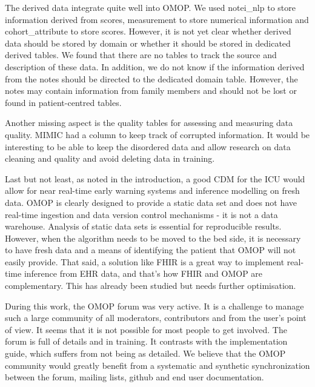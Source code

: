 The derived data integrate quite well into OMOP. We used notei\_nlp to store 
information derived from scores, measurement to store numerical information 
and cohort\_attribute to store scores. However, it is not yet clear whether 
derived data should be stored by domain or whether it should be stored in 
dedicated derived tables. We found that there are no tables to track the source 
and description of these data. 
In addition, we do not know if the information derived from the notes should 
be directed to the dedicated domain table. 
However, the notes may contain information from family members and should not be 
lost or found in patient-centred tables. 


Another missing aspect is the quality tables for assessing and measuring data 
quality. MIMIC had a column to keep track of corrupted information. 
It would be interesting to be able to keep the disordered data and allow 
research on data cleaning and quality and avoid deleting data in training.



Last but not least, as noted in the introduction, a good CDM for the ICU would 
allow for near real-time early warning systems and inference modelling on fresh 
data. OMOP is clearly designed to provide a static data set and does not have 
real-time ingestion and data version control mechanisms - it is not a data 
warehouse. Analysis of static data sets is essential for reproducible results. 
However, when the algorithm needs to be moved to the bed side, it is necessary 
to have fresh data and a means of identifying the patient that OMOP will not 
easily provide. That said, a solution like FHIR is a great way to implement 
real-time inference from EHR data, and that's how FHIR and OMOP are complementary. 
This has already been studied \cite{gatech}  but needs further optimisation.

During this work, the OMOP forum was very active. It is a challenge to manage 
such a large community of all moderators, contributors and from the user's 
point of view. It seems that it is not possible for most people to get involved. 
The forum is full of details and in training. It contrasts with the implementation 
guide, which suffers from not being as detailed. We believe that the OMOP 
community would greatly benefit from a systematic and synthetic synchronization 
between the forum, mailing lists, github and end user documentation.


